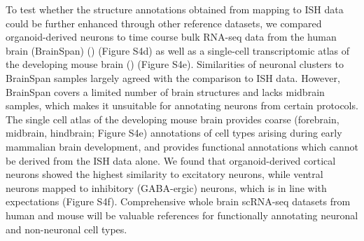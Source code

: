 To test whether the structure annotations obtained from mapping to ISH data could be further enhanced through other reference datasets, we compared organoid-derived neurons to time course bulk RNA-seq data from the human brain (BrainSpan) (\cite{thompson_high-resolution_2014}) (Figure S4d) as well as a single-cell transcriptomic atlas of the developing mouse brain (\cite{la_manno_molecular_2021}) (Figure S4e). Similarities of neuronal clusters to BrainSpan samples largely agreed with the comparison to ISH data. However, BrainSpan covers a limited number of brain structures and lacks midbrain samples, which makes it unsuitable for annotating neurons from certain protocols. The single cell atlas of the developing mouse brain provides coarse (forebrain, midbrain, hindbrain; Figure S4e) annotations of cell types arising during early mammalian brain development, and provides functional annotations which cannot be derived from the ISH data alone. We found that organoid-derived cortical neurons showed the highest similarity to excitatory neurons, while ventral neurons mapped to inhibitory (GABA-ergic) neurons, which is in line with expectations (Figure S4f). Comprehensive whole brain scRNA-seq datasets from human and mouse will be valuable references for functionally annotating neuronal and non-neuronal cell types.

